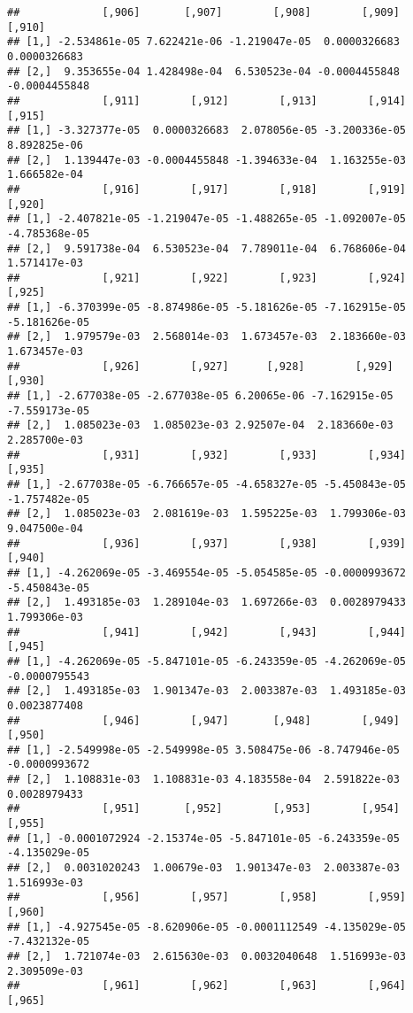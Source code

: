 \documentclass[
]{article}
\begin{document}
\begin{verbatim}
##             [,906]       [,907]        [,908]        [,909]        [,910]
## [1,] -2.534861e-05 7.622421e-06 -1.219047e-05  0.0000326683  0.0000326683
## [2,]  9.353655e-04 1.428498e-04  6.530523e-04 -0.0004455848 -0.0004455848
##             [,911]        [,912]        [,913]        [,914]       [,915]
## [1,] -3.327377e-05  0.0000326683  2.078056e-05 -3.200336e-05 8.892825e-06
## [2,]  1.139447e-03 -0.0004455848 -1.394633e-04  1.163255e-03 1.666582e-04
##             [,916]        [,917]        [,918]        [,919]        [,920]
## [1,] -2.407821e-05 -1.219047e-05 -1.488265e-05 -1.092007e-05 -4.785368e-05
## [2,]  9.591738e-04  6.530523e-04  7.789011e-04  6.768606e-04  1.571417e-03
##             [,921]        [,922]        [,923]        [,924]        [,925]
## [1,] -6.370399e-05 -8.874986e-05 -5.181626e-05 -7.162915e-05 -5.181626e-05
## [2,]  1.979579e-03  2.568014e-03  1.673457e-03  2.183660e-03  1.673457e-03
##             [,926]        [,927]      [,928]        [,929]        [,930]
## [1,] -2.677038e-05 -2.677038e-05 6.20065e-06 -7.162915e-05 -7.559173e-05
## [2,]  1.085023e-03  1.085023e-03 2.92507e-04  2.183660e-03  2.285700e-03
##             [,931]        [,932]        [,933]        [,934]        [,935]
## [1,] -2.677038e-05 -6.766657e-05 -4.658327e-05 -5.450843e-05 -1.757482e-05
## [2,]  1.085023e-03  2.081619e-03  1.595225e-03  1.799306e-03  9.047500e-04
##             [,936]        [,937]        [,938]        [,939]        [,940]
## [1,] -4.262069e-05 -3.469554e-05 -5.054585e-05 -0.0000993672 -5.450843e-05
## [2,]  1.493185e-03  1.289104e-03  1.697266e-03  0.0028979433  1.799306e-03
##             [,941]        [,942]        [,943]        [,944]        [,945]
## [1,] -4.262069e-05 -5.847101e-05 -6.243359e-05 -4.262069e-05 -0.0000795543
## [2,]  1.493185e-03  1.901347e-03  2.003387e-03  1.493185e-03  0.0023877408
##             [,946]        [,947]       [,948]        [,949]        [,950]
## [1,] -2.549998e-05 -2.549998e-05 3.508475e-06 -8.747946e-05 -0.0000993672
## [2,]  1.108831e-03  1.108831e-03 4.183558e-04  2.591822e-03  0.0028979433
##             [,951]       [,952]        [,953]        [,954]        [,955]
## [1,] -0.0001072924 -2.15374e-05 -5.847101e-05 -6.243359e-05 -4.135029e-05
## [2,]  0.0031020243  1.00679e-03  1.901347e-03  2.003387e-03  1.516993e-03
##             [,956]        [,957]        [,958]        [,959]        [,960]
## [1,] -4.927545e-05 -8.620906e-05 -0.0001112549 -4.135029e-05 -7.432132e-05
## [2,]  1.721074e-03  2.615630e-03  0.0032040648  1.516993e-03  2.309509e-03
##             [,961]        [,962]        [,963]        [,964]        [,965]

\end{verbatim}
\end{document}
